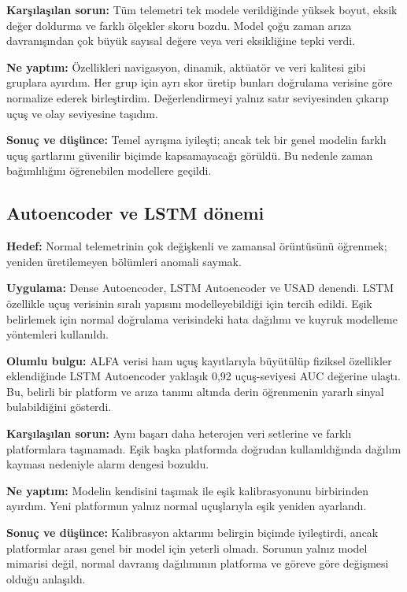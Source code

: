 \documentclass[11pt,a4paper]{article}
\begin{document}
\textbf{Karşılaşılan sorun:} Tüm telemetri tek modele verildiğinde yüksek
boyut, eksik değer doldurma ve farklı ölçekler skoru bozdu. Model çoğu zaman
arıza davranışından çok büyük sayısal değere veya veri eksikliğine tepki verdi.

\textbf{Ne yaptım:} Özellikleri navigasyon, dinamik, aktüatör ve veri kalitesi
gibi gruplara ayırdım. Her grup için ayrı skor üretip bunları doğrulama verisine
göre normalize ederek birleştirdim. Değerlendirmeyi yalnız satır seviyesinden
çıkarıp uçuş ve olay seviyesine taşıdım.

\textbf{Sonuç ve düşünce:} Temel ayrışma iyileşti; ancak tek bir genel modelin
farklı uçuş şartlarını güvenilir biçimde kapsamayacağı görüldü. Bu nedenle
zaman bağımlılığını öğrenebilen modellere geçildi.

\subsection{Autoencoder ve LSTM dönemi}

\textbf{Hedef:} Normal telemetrinin çok değişkenli ve zamansal örüntüsünü
öğrenmek; yeniden üretilemeyen bölümleri anomali saymak.

\textbf{Uygulama:} Dense Autoencoder, LSTM Autoencoder ve USAD denendi. LSTM
özellikle uçuş verisinin sıralı yapısını modelleyebildiği için tercih edildi.
Eşik belirlemek için normal doğrulama verisindeki hata dağılımı ve kuyruk
modelleme yöntemleri kullanıldı.

\textbf{Olumlu bulgu:} ALFA verisi ham uçuş kayıtlarıyla büyütülüp fiziksel
özellikler eklendiğinde LSTM Autoencoder yaklaşık 0{,}92 uçuş-seviyesi AUC
değerine ulaştı. Bu, belirli bir platform ve arıza tanımı altında derin
öğrenmenin yararlı sinyal bulabildiğini gösterdi.

\textbf{Karşılaşılan sorun:} Aynı başarı daha heterojen veri setlerine ve farklı
platformlara taşınamadı. Eşik başka platformda doğrudan kullanıldığında dağılım
kayması nedeniyle alarm dengesi bozuldu.

\textbf{Ne yaptım:} Modelin kendisini taşımak ile eşik kalibrasyonunu birbirinden
ayırdım. Yeni platformun yalnız normal uçuşlarıyla eşik yeniden ayarlandı.

\textbf{Sonuç ve düşünce:} Kalibrasyon aktarımı belirgin biçimde iyileştirdi,
ancak platformlar arası genel bir model için yeterli olmadı. Sorunun yalnız
model mimarisi değil, normal davranış dağılımının platforma ve göreve göre
değişmesi olduğu anlaşıldı.
\end{document}
